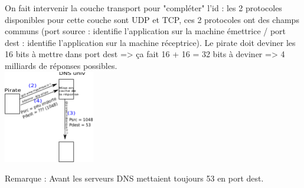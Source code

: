  On fait intervenir la couche transport pour "compléter" l'id : les 2 protocoles disponibles pour cette couche sont UDP et TCP, ces 2 protocoles ont des champs communs (port source : identifie l'application sur la machine émettrice / port dest : identifie l'application sur la machine réceptrice). Le pirate doit deviner les 16 bits à mettre dans port dest => ça fait 16 + 16 = 32 bits à deviner => 4 milliards de réponses possibles. \\

\includegraphics[width=150px]{Images/14_DNSsolution.pdf} 

Remarque : Avant les serveurs DNS mettaient toujours 53 en port dest.

